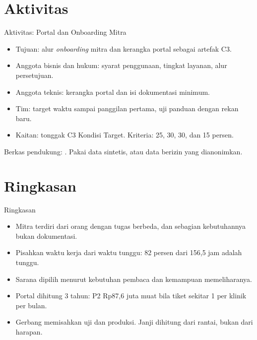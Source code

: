 \documentclass[aspectratio=169, table, 12pt]{beamer}
\begin{document}
\section{Aktivitas}

\begin{frame}{{\Large Aktivitas: Portal dan Onboarding Mitra}}
  \vspace{4pt}
  \begin{itemize}
    \item Tujuan: alur \textit{onboarding} mitra dan kerangka portal sebagai artefak C3.
    \item Anggota bisnis dan hukum: syarat penggunaan, tingkat layanan, alur persetujuan.
    \item Anggota teknis: kerangka portal dan isi dokumentasi minimum.
    \item Tim: target waktu sampai panggilan pertama, uji panduan dengan rekan baru.
    \item Kaitan: tonggak C3 Kondisi Target. Kriteria: 25, 30, 30, dan 15 persen.
  \end{itemize}
  \vspace{4pt}
  {\footnotesize Berkas pendukung: . Pakai data sintetis, atau data berizin yang dianonimkan.}
\end{frame}

\section{Ringkasan}

\begin{frame}{{\Large Ringkasan}}
  \vspace{4pt}
  \begin{itemize}
    \item Mitra terdiri dari orang dengan tugas berbeda, dan sebagian kebutuhannya bukan dokumentasi.
    \item Pisahkan waktu kerja dari waktu tunggu: 82 persen dari 156,5 jam adalah tunggu.
    \item Sarana dipilih menurut kebutuhan pembaca dan kemampuan memeliharanya.
    \item Portal dihitung 3 tahun: P2 Rp87,6 juta muat bila tiket sekitar 1 per klinik per bulan.
    \item Gerbang memisahkan uji dan produksi. Janji dihitung dari rantai, bukan dari harapan.
  \end{itemize}
\end{frame}
\end{document}
